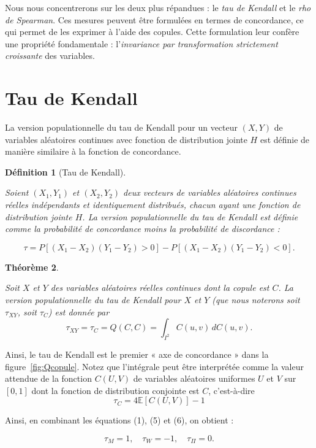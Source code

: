 \documentclass[a4paper,11pt]{amsbook}
\numberwithin{equation}{chapter}
\newtheorem{theoreme}			     {Théorème}	[chapter]
\newtheorem{definition}	[theoreme]   {Définition}
\theoremstyle{definition}
\begin{document}
Nous nous concentrerons sur les deux plus répandues : le \emph{tau de Kendall} et le \emph{rho de Spearman}. Ces mesures peuvent être formulées en termes de concordance, ce qui permet de les exprimer à l’aide des copules. Cette formulation leur confère une propriété fondamentale : l’\emph{invariance par transformation strictement croissante} des variables.

\section{Tau de Kendall}
La version populationnelle du tau de Kendall pour un vecteur \( (X,Y) \) de variables aléatoires continues avec fonction de distribution jointe \( H \) est définie de manière similaire à la fonction de concordance.

\begin{definition}[Tau de Kendall]\label{def:tau}
    
Soient \( (X_1, Y_1) \) et \( (X_2, Y_2) \) deux vecteurs de variables aléatoires continues réelles indépendants et identiquement distribués, chacun ayant une fonction de distribution jointe \( H \). La version populationnelle du tau de Kendall est définie comme la probabilité de concordance moins la probabilité de discordance :

\[
\tau = P[(X_1 - X_2)(Y_1 - Y_2) > 0] - P[(X_1 - X_2)(Y_1 - Y_2) < 0].
\]
\end{definition}

\begin{theoreme}\label{thm:tau}
    
Soit \( X \) et \( Y \) des variables aléatoires réelles continues dont la copule est \( C \). La version populationnelle du tau de Kendall pour \( X \) et \( Y \) (que nous noterons soit \( \tau_{XY} \), soit \( \tau_C \)) est donnée par
\[
\tau_{XY} = \tau_C = Q(C,C) = \int_{I^2} C(u,v) \, dC(u,v).
\]
\end{theoreme}

Ainsi, le tau de Kendall est le premier « axe de concordance » dans la figure~\ref{fig:Qcopule}. Notez que l'intégrale peut être interprétée comme la valeur attendue de la fonction \( C(U,V) \) de variables aléatoires uniformes \( U \) et \( V \) sur \( [0,1] \) dont la fonction de distribution conjointe est \( C \), c'est-à-dire
\[
\tau_C = 4\mathbb{E}[C(U,V)]-1
\]

Ainsi, en combinant les équations (1), (5) et (6), on obtient :

\[
\tau_M = 1, \quad \tau_W = -1, \quad \tau_{\Pi} = 0.
\]
\end{document}
